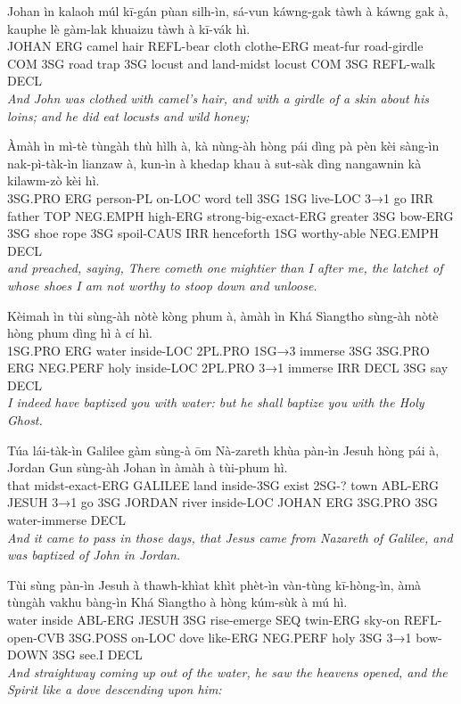 \documentclass[11pt,a4paper]{article}
\begin{document}
\begin{exe}
\gll Johan ìn kalaoh múl kī-gán pùan silh-ìn, sá-vun káwng-gak tàwh à káwng gak à, kauphe lè gàm-lak khuaizu tàwh à kī-vák hì. \\
     JOHAN ERG camel hair REFL-bear cloth clothe-ERG meat-fur road-girdle COM 3SG road trap 3SG locust and land-midst locust COM 3SG REFL-walk DECL \\
\glt \textcolor{kjvcolor}{\textit{And John was clothed with camel's hair, and with a girdle of a skin about his loins; and he did eat locusts and wild honey;}}

\gll Àmàh ìn mì-tè tùngàh thù hìlh à, kà nùng-àh hòng pái dìng pà pèn kèi sàng-ìn nak-pì-tàk-ìn lianzaw à, kun-ìn à khedap khau à sut-sàk dìng nangawnin kà kilawm-zò kèi hì. \\
     3SG.PRO ERG person-PL on-LOC word tell 3SG 1SG live-LOC 3→1 go IRR father TOP NEG.EMPH high-ERG strong-big-exact-ERG greater 3SG bow-ERG 3SG shoe rope 3SG spoil-CAUS IRR henceforth 1SG worthy-able NEG.EMPH DECL \\
\glt \textcolor{kjvcolor}{\textit{and preached, saying, There cometh one mightier than I after me, the latchet of whose shoes I am not worthy to stoop down and unloose.}}

\gll Kèimah ìn tùi sùng-àh nòtè kòng phum à, àmàh ìn Khá Sìangtho sùng-àh nòtè hòng phum dìng hì à cí hì. \\
     1SG.PRO ERG water inside-LOC 2PL.PRO 1SG→3 immerse 3SG 3SG.PRO ERG NEG.PERF holy inside-LOC 2PL.PRO 3→1 immerse IRR DECL 3SG say DECL \\
\glt \textcolor{kjvcolor}{\textit{I indeed have baptized you with water: but he shall baptize you with the Holy Ghost.}}

\gll Túa lái-tàk-ìn Galilee gàm sùng-à ōm Nà-zareth khùa pàn-ìn Jesuh hòng pái à, Jordan Gun sùng-àh Johan ìn àmàh à tùi-phum hì. \\
     that midst-exact-ERG GALILEE land inside-3SG exist 2SG-? town ABL-ERG JESUH 3→1 go 3SG JORDAN river inside-LOC JOHAN ERG 3SG.PRO 3SG water-immerse DECL \\
\glt \textcolor{kjvcolor}{\textit{And it came to pass in those days, that Jesus came from Nazareth of Galilee, and was baptized of John in Jordan.}}

\gll Tùi sùng pàn-ìn Jesuh à thawh-khìat khìt phèt-ìn vàn-tùng kī-hòng-ìn, àmà tùngàh vakhu bàng-ìn Khá Sìangtho à hòng kúm-sùk à mú hì. \\
     water inside ABL-ERG JESUH 3SG rise-emerge SEQ twin-ERG sky-on REFL-open-CVB 3SG.POSS on-LOC dove like-ERG NEG.PERF holy 3SG 3→1 bow-DOWN 3SG see.I DECL \\
\glt \textcolor{kjvcolor}{\textit{And straightway coming up out of the water, he saw the heavens opened, and the Spirit like a dove descending upon him:}}


\end{exe}
\end{document}

